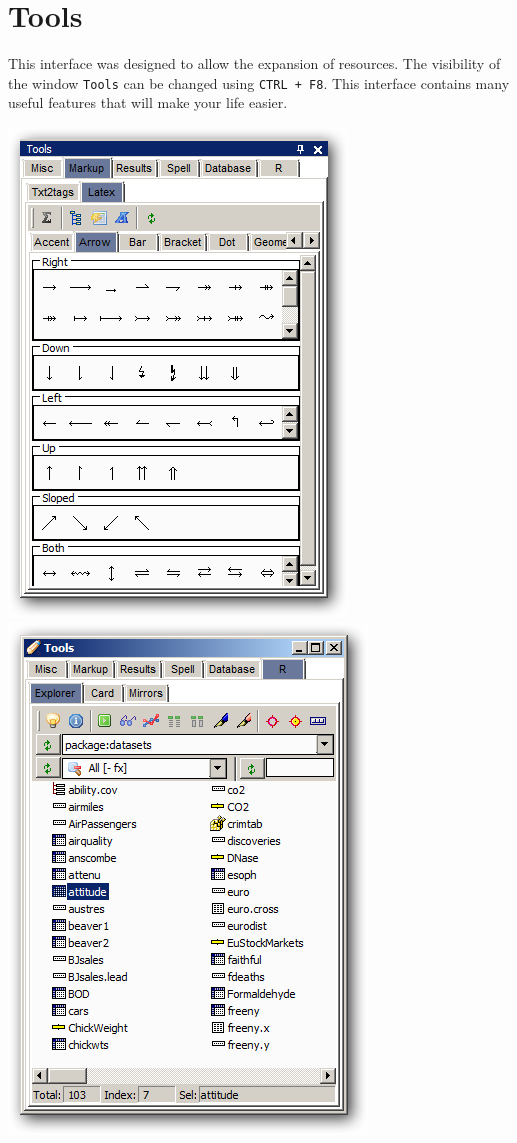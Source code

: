 
\section{Tools}

This interface was designed to allow the expansion of resources.
The visibility of the window \texttt{Tools} can be changed using \texttt{CTRL + F8}.
This interface contains many useful features that will make your life easier.

\includegraphics[scale=0.50]{./res/tools_markup_latex_arrows.png}
\includegraphics[scale=0.50]{./res/tools_r_explorer.png}

